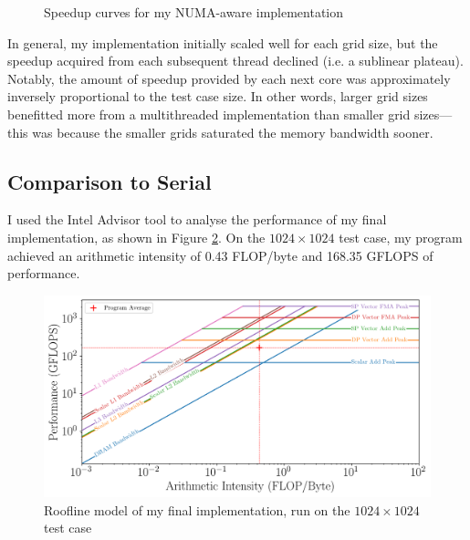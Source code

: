 \documentclass[twocolumn, a4paper]{article}
\begin{document}
\begin{figure}[htpb]
{
  }
  \caption{Speedup curves for my NUMA-aware implementation}\label{fig:scaling}
\end{figure}

In general, my implementation initially scaled well for each grid size, but the speedup acquired from each subsequent thread declined (i.e. a sublinear plateau).
Notably, the amount of speedup provided by each next core was approximately inversely proportional to the test case size.
In other words, larger grid sizes benefitted more from a multithreaded implementation than smaller grid sizes---this was because the smaller grids saturated the memory bandwidth sooner.

\subsection{Comparison to Serial}

I used the Intel Advisor tool to analyse the performance of my final implementation, as shown in Figure \ref{fig:roofline_numa}.
On the $1024\times1024$ test case, my program achieved an arithmetic intensity of 0.43 FLOP/byte and 168.35 GFLOPS of performance.

\begin{figure}[htbp]
  \includegraphics[width=\linewidth]{roofline_numa.png}
  \caption{Roofline model of my final implementation, run on the $1024\times1024$ test case}\label{fig:roofline_numa}
\end{figure}
\end{document}
